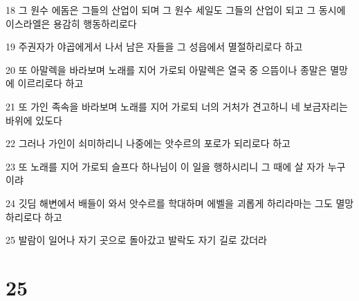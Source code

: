 \par 18 그 원수 에돔은 그들의 산업이 되며 그 원수 세일도 그들의 산업이 되고 그 동시에 이스라엘은 용감히 행동하리로다
\par 19 주권자가 야곱에게서 나서 남은 자들을 그 성읍에서 멸절하리로다 하고
\par 20 또 아말렉을 바라보며 노래를 지어 가로되 아말렉은 열국 중 으뜸이나 종말은 멸망에 이르리로다 하고
\par 21 또 가인 족속을 바라보며 노래를 지어 가로되 너의 거처가 견고하니 네 보금자리는 바위에 있도다
\par 22 그러나 가인이 쇠미하리니 나중에는 앗수르의 포로가 되리로다 하고
\par 23 또 노래를 지어 가로되 슬프다 하나님이 이 일을 행하시리니 그 때에 살 자가 누구이랴
\par 24 깃딤 해변에서 배들이 와서 앗수르를 학대하며 에벨을 괴롭게 하리라마는 그도 멸망하리로다 하고
\par 25 발람이 일어나 자기 곳으로 돌아갔고 발락도 자기 길로 갔더라

\chapter{25}

